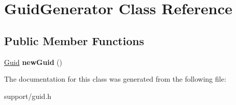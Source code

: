 \hypertarget{classGuidGenerator}{}\section{Guid\+Generator Class Reference}
\label{classGuidGenerator}
\subsection*{Public Member Functions}
\begin{DoxyCompactItemize}
\item 
\mbox{\label{classGuidGenerator_ae9908bc9e9af17e794abcc59e3b5af64}} 
\hyperlink{classGuid}{Guid} {\bfseries new\+Guid} ()
\end{DoxyCompactItemize}


The documentation for this class was generated from the following file\+:\begin{DoxyCompactItemize}
\item 
support/guid.\+h\end{DoxyCompactItemize}
